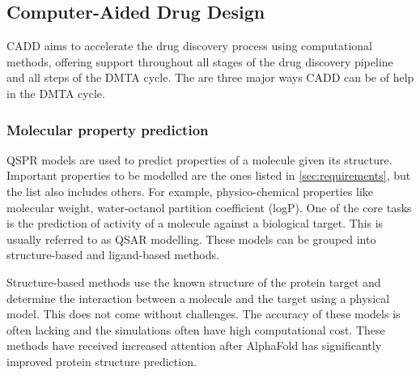 

\subsection{Computer-Aided Drug Design}
\Ac{CADD} aims to accelerate the drug discovery
process using computational methods, offering support throughout all stages of 
the drug discovery pipeline and all steps of the DMTA cycle.
The are three major ways CADD can be of help in the DMTA cycle.

\subsubsection{Molecular property prediction}
\Ac{QSPR} models are used to predict properties of a molecule given 
its structure. Important properties to be modelled are the ones listed in \ref{sec:requirements}, 
but the list also includes others. For example, physico-chemical properties like molecular weight,
water-octanol partition coefficient (logP). 
One of the core tasks is the prediction of activity of a molecule against a biological target. 
This is usually referred to as \ac{QSAR} modelling. These models can be grouped into 
structure-based and ligand-based methods.

Structure-based methods use the known structure of the protein target and determine the interaction 
between a molecule and the target using a physical model. 
This does not come without challenges. The accuracy of these models is often lacking and the simulations 
often have high computational cost. These methods have received increased attention 
after AlphaFold \citep{todo} has significantly improved protein structure prediction.

